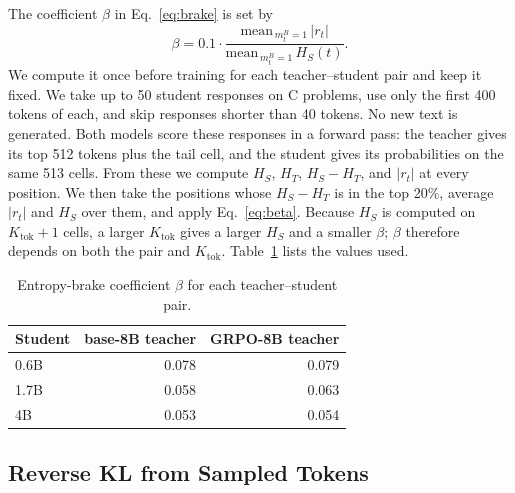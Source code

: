 \documentclass[10pt]{article}
\begin{document}
The coefficient $\beta$ in Eq.~\ref{eq:brake} is set by
\begin{equation}
\beta=0.1\cdot\frac{\mathrm{mean}_{\,m^B_t=1}\,|r_t|}{\mathrm{mean}_{\,m^B_t=1}\,H_S(t)}.
\label{eq:beta}
\end{equation}
We compute it once before training for each teacher--student pair and keep it
fixed. We take up to 50 student responses on C problems, use only the first
400 tokens of each, and skip responses shorter than 40 tokens. No new text is
generated. Both models score these responses in a forward pass: the teacher
gives its top 512 tokens plus the tail cell, and the student gives its
probabilities on the same 513 cells. From these we compute $H_S$, $H_T$,
$H_S-H_T$, and $|r_t|$ at every position. We then take the positions whose
$H_S-H_T$ is in the top 20\%, average $|r_t|$ and $H_S$ over them, and apply
Eq.~\ref{eq:beta}. Because $H_S$ is computed on $K_{\mathrm{tok}}+1$ cells, a
larger $K_{\mathrm{tok}}$ gives a larger $H_S$ and a smaller $\beta$; $\beta$
therefore depends on both the pair and $K_{\mathrm{tok}}$.
Table~\ref{tab:beta} lists the values used.

\begin{table}[h]
\centering
\small
\caption{Entropy-brake coefficient $\beta$ for each teacher--student pair.}
\label{tab:beta}
\begin{tabular}{lrr}
\toprule
Student & base-8B teacher & GRPO-8B teacher \\
\midrule
0.6B & 0.078 & 0.079 \\
1.7B & 0.058 & 0.063 \\
4B & 0.053 & 0.054 \\
\bottomrule
\end{tabular}
\end{table}

\subsection{Reverse KL from Sampled Tokens}
\label{app:rkl}
\end{document}
